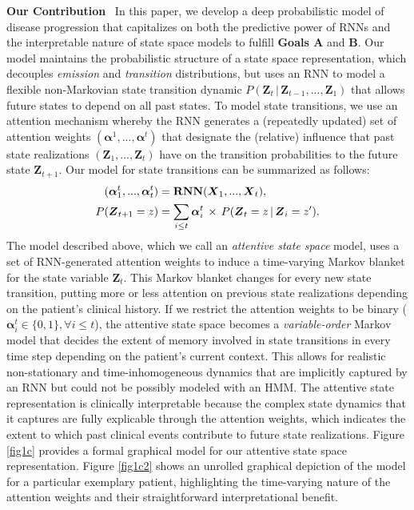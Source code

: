 \documentclass[twoside,11pt]{article}
\begin{document}
{\bf Our Contribution}\,\,\, In this paper, we develop a deep probabilistic model of disease progression that capitalizes on both the predictive power of RNNs and the interpretable nature of state space models to fulfill {\bf Goals A} and {\bf B}. Our model maintains the probabilistic structure of a state space representation, which decouples {\it emission} and {\it transition} distributions, but uses an RNN to model a flexible non-Markovian state transition dynamic \mbox{\footnotesize $P(\boldsymbol{Z}_t\,|\,\boldsymbol{Z}_{t-1}, . . . , \boldsymbol{Z}_1)$} that allows future states to depend on all past states. To model state transitions, we use an attention mechanism whereby the RNN generates a (repeatedly updated) set of attention weights \mbox{\footnotesize $(\boldsymbol{\alpha}^1, . . . , \boldsymbol{\alpha}^t)$} that designate the (relative) influence that past state realizations \mbox{\footnotesize $(\boldsymbol{Z}_1, . . . , \boldsymbol{Z}_t)$} have on the transition probabilities to the future state \mbox{\footnotesize $\boldsymbol{Z}_{t+1}$}. Our model for state transitions can be summarized as follows:
\begin{align}
(\boldsymbol{\alpha}_1^t, . . . , \boldsymbol{\alpha}_{t}^t) &= {\bf RNN}(\boldsymbol{X}_1, . . . , \boldsymbol{X}_t), \nonumber \\
P(\boldsymbol{Z}_{t+1} = z) &= \sum_{i \leq t} \boldsymbol{\alpha}_i^t \, \times \, P(\boldsymbol{Z}_t = z\,|\,\boldsymbol{Z}_i = z^{\prime}). \nonumber
\end{align}
The model described above, which we call an {\it attentive state space} model, uses a set of RNN-generated attention weights to induce a time-varying Markov blanket for the state variable \mbox{\footnotesize $\boldsymbol{Z}_{t}$}. This Markov blanket changes for every new state transition, putting more or less attention on previous state realizations depending on the patient's clinical history. If we restrict the attention weights to be binary ($\boldsymbol{\alpha}_i^t \in \{0,1\}, \forall i \leq t$), the attentive state space becomes a {\it variable-order} Markov model that decides the extent of memory involved in state transitions in every time step depending on the patient's current context. This allows for realistic non-stationary and time-inhomogeneous dynamics that are implicitly captured by an RNN but could not be possibly modeled with an HMM. The attentive state representation is clinically interpretable because the complex state dynamics that it captures are fully explicable through the attention weights, which indicates the extent to which past clinical events contribute to future state realizations. Figure \ref{fig1c} provides a formal graphical model for our attentive state space representation. Figure \ref{fig1c2} shows an unrolled graphical depiction of the model for a particular exemplary patient, highlighting the time-varying nature of the attention weights and their straightforward interpretational benefit.   
\end{document}
